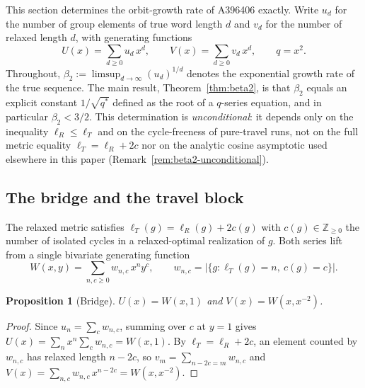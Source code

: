 \documentclass[11pt]{article}
\theoremstyle{plain}
\newtheorem{proposition}[theorem]{Proposition}
\theoremstyle{definition}
\theoremstyle{remark}
\begin{document}
This section determines the orbit-growth rate of A396406 exactly. Write $u_d$
for the number of group elements of true word length $d$ and $v_d$ for the
number of relaxed length $d$, with generating functions
\[
  U(x)=\sum_{d\ge0}u_d\,x^d,\qquad
  V(x)=\sum_{d\ge0}v_d\,x^d,\qquad q=x^2 .
\]
Throughout, $\beta_2:=\limsup_{d\to\infty}(u_d)^{1/d}$ denotes the exponential
growth rate of the true sequence. The main result, Theorem~\ref{thm:beta2}, is
that $\beta_2$ equals an explicit constant $1/\sqrt{q^\ast}$ defined as the root
of a $q$-series equation, and in particular $\beta_2<3/2$. This determination is
\emph{unconditional}: it depends only on the inequality $\ell_R\le\ell_T$ and on
the cycle-freeness of pure-travel runs, not on the full metric equality
$\ell_T=\ell_R+2c$ nor on the analytic cosine asymptotic used elsewhere in this
paper (Remark~\ref{rem:beta2-unconditional}).

\subsection{The bridge and the travel block}

The relaxed metric satisfies $\ell_T(g)=\ell_R(g)+2c(g)$ with
$c(g)\in\mathbb Z_{\ge0}$ the number of isolated cycles in a relaxed-optimal
realization of $g$. Both series lift from a single bivariate generating
function
\[
  W(x,y)=\sum_{n,c\ge0}w_{n,c}\,x^{n}y^{c},
  \qquad
  w_{n,c}=\bigl|\{g:\ell_T(g)=n,\ c(g)=c\}\bigr| .
\]

\begin{proposition}[Bridge]\label{prop:beta2-bridge}
$U(x)=W(x,1)$ and $V(x)=W(x,x^{-2})$.
\end{proposition}

\begin{proof}
Since $u_n=\sum_c w_{n,c}$, summing over $c$ at $y=1$ gives
$U(x)=\sum_n x^n\sum_c w_{n,c}=W(x,1)$. By $\ell_T=\ell_R+2c$, an element
counted by $w_{n,c}$ has relaxed length $n-2c$, so
$v_m=\sum_{n-2c=m}w_{n,c}$ and
$V(x)=\sum_{n,c}w_{n,c}\,x^{n-2c}=W(x,x^{-2})$.
\end{proof}
\end{document}
